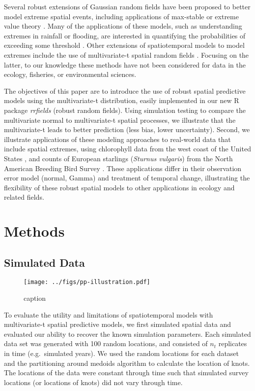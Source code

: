 \documentclass[12pt,english]{article}
\begin{document}
Several robust extensions of Gaussian random fields have been proposed to
better model extreme spatial events, including applications of max-stable or
extreme value theory \citep{davison2012, davison2012a}. Many of the
applications of these models, such as understanding extremes in rainfall or
flooding, are interested in quantifying the probabilities of exceeding some
threshold \citep{davis2008}. Other extensions of spatiotemporal models to model
extremes include the use of multivariate-t spatial random fields
\citep{roislien2007}. Focusing on the latter, to our knowledge these methods
have not been considered for data in the ecology, fisheries, or environmental
sciences.

The objectives of this paper are to introduce the use of robust spatial
predictive models using the multivariate-t distribution, easily implemented in
our new R package \emph{rrfields} (robust random fields). Using simulation
testing to compare the multivariate normal to multivariate-t spatial processes,
we illustrate that the multivariate-t leads to better prediction (less bias,
lower uncertainty). Second, we illustrate applications of these modeling
approaches to real-world data that include spatial extremes, using chlorophyll
data from the west coast of the United States \citep{mckibben2012}, and counts
of European starlings (\emph{Sturnus vulgaris}) from the North American
Breeding Bird Survey \citep{pardieck2016}. These applications differ in their
observation error model (normal, Gamma) and treatment of temporal change,
illustrating the flexibility of these robust spatial models to other
applications in ecology and related fields.

\section{Methods}

\subsection{Simulated Data}

\begin{figure}[htb]
\begin{center}
  \texttt{[image: ../figs/pp-illustration.pdf]}
\caption{caption}
\label{fig:didactic}
\end{center}
\end{figure}

To evaluate the utility and limitations of spatiotemporal models with
multivariate-t spatial predictive models, we first simulated spatial data and
evaluated our ability to recover the known simulation parameters. Each
simulated data set was generated with 100 random locations, and consisted of
$n_t$ replicates in time (e.g.~simulated years). We used the random locations
for each dataset and the partitioning around medoids algorithm
\citep[\texttt{pam()} in the R package \textbf{cluster};][]{reynolds2006} to
calculate the location of knots. The locations of the data were constant
through time such that simulated survey locations (or locations of knots) did
not vary through time.
\end{document}
